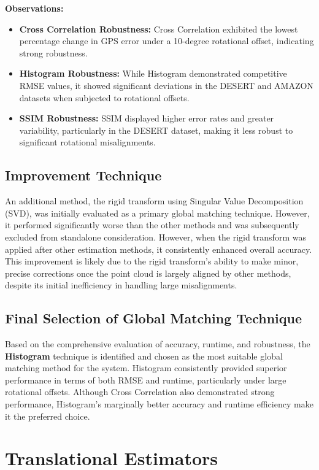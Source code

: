 \begin{itemize}
\textbf{Observations:}  
\begin{itemize}
    \item \textbf{Cross Correlation Robustness:} Cross Correlation exhibited the lowest percentage change in GPS error under a 10-degree rotational offset, indicating strong robustness.
    \item \textbf{Histogram Robustness:} While Histogram demonstrated competitive RMSE values, it showed significant deviations in the DESERT and AMAZON datasets when subjected to rotational offsets.
    \item \textbf{SSIM Robustness:} SSIM displayed higher error rates and greater variability, particularly in the DESERT dataset, making it less robust to significant rotational misalignments.
\end{itemize}

\subsection{Improvement Technique}

An additional method, the rigid transform using Singular Value Decomposition (SVD), was initially evaluated as a primary global matching technique. However, it performed significantly worse than the other methods and was subsequently excluded from standalone consideration. However, when the rigid transform was applied after other estimation methods, it consistently enhanced overall accuracy. This improvement is likely due to the rigid transform's ability to make minor, precise corrections once the point cloud is largely aligned by other methods, despite its initial inefficiency in handling large misalignments.

\subsection{Final Selection of Global Matching Technique}

Based on the comprehensive evaluation of accuracy, runtime, and robustness, the \textbf{Histogram} technique is identified and chosen as the most suitable global matching method for the system. Histogram consistently provided superior performance in terms of both RMSE and runtime, particularly under large rotational offsets. Although Cross Correlation also demonstrated strong performance, Histogram's marginally better accuracy and runtime efficiency make it the preferred choice.



\section{Translational Estimators}


\end{itemize}
